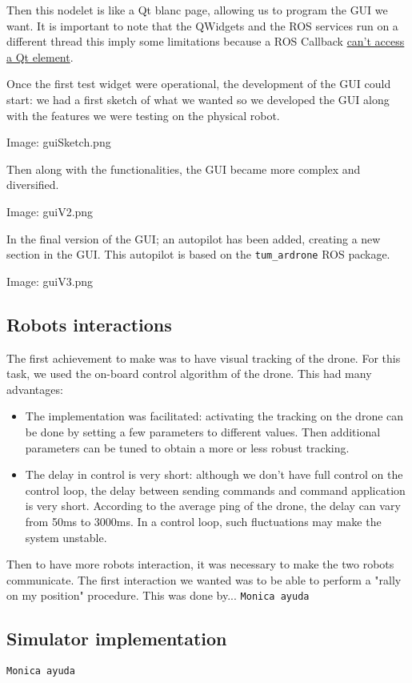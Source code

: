 \documentclass[11pt,a4paper]{article}
\newcommand{\centerImage}[1]{
\begin{center}
Image: #1
\end{center}
}
\newcommand{\Monica}{\texttt{Monica ayuda}}
\begin{document}
Then this nodelet is like a Qt blanc page, allowing us to program the GUI we want. It is 
important to note that the QWidgets and the ROS services run on a different thread this 
imply some limitations because a ROS Callback
\href{http://wiki.ros.org/rqt/Tutorials/Writing\%20a\%20C\%2B\%2B\%20Plugin}
{can't access a Qt element}.

Once the first test widget were operational, the development of the GUI could start: we had a 
first sketch of what we wanted so we developed the GUI along with the features we were
testing on the physical robot.
\centerImage{guiSketch.png}

Then along with the functionalities, the GUI became more complex and diversified.
\centerImage{guiV2.png}

In the final version of the GUI; an autopilot has been added, creating a new section in the 
GUI. This autopilot is based on the \verb!tum_ardrone! ROS package.
\centerImage{guiV3.png}

\subsection{Robots interactions}
The first achievement to make was to have visual tracking of the drone. For this task, we used 
the on-board control algorithm of the drone. This had many advantages: 
\begin{itemize}
\item The implementation was facilitated: activating the tracking on the drone can be done by 
setting a few parameters to different values. Then additional parameters can be tuned to
obtain a more or less robust tracking.
\item The delay in control is very short: although we don't have full control on the control
loop, the delay between sending commands and command application is very short. According to
the average ping of the drone, the delay can vary from 50ms to 3000ms. In a control loop,
such fluctuations may make the system unstable.
\end{itemize}

Then to have more robots interaction, it was necessary to make the two robots communicate.
The first interaction we wanted was to be able to perform a "rally on my position" procedure.
This was done by...  \Monica

\subsection{Simulator implementation}
\Monica
\end{document}
